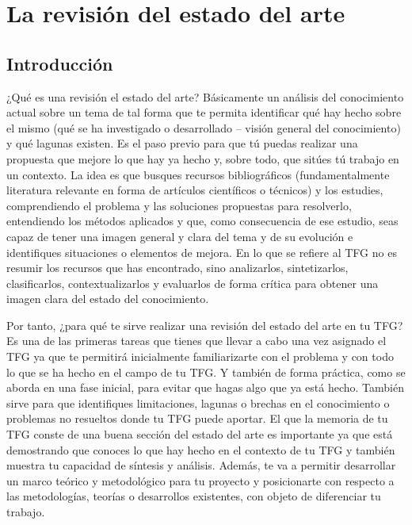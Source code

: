 \chapter{La revisión del estado del arte} \label{cap:RevisionEstadoDelArte}


\section{Introducción}
¿Qué es una revisión el estado del arte? Básicamente un análisis del conocimiento actual sobre un tema de tal forma que te permita identificar qué hay hecho sobre el mismo (qué se ha investigado o desarrollado -- visión general del conocimiento) y qué lagunas existen. Es el paso previo para que tú puedas realizar una propuesta que mejore lo que hay ya hecho y, sobre todo, que sitúes tú trabajo en un contexto. La idea es que busques recursos bibliográficos (fundamentalmente literatura relevante en forma de artículos científicos o técnicos) y los estudies, comprendiendo el problema y las soluciones propuestas para resolverlo, entendiendo los métodos aplicados y que, como consecuencia de ese estudio, seas capaz de tener una imagen general y clara del tema y de su evolución e identifiques situaciones o elementos de mejora. En lo que se refiere al TFG no es resumir los recursos que has encontrado, sino analizarlos, sintetizarlos, clasificarlos, contextualizarlos y evaluarlos de forma crítica para obtener una imagen clara del estado del conocimiento.

Por tanto, ¿para qué te sirve realizar una revisión del estado del arte en tu TFG? Es una de las primeras tareas que tienes que llevar a cabo una vez asignado el TFG ya que te permitirá inicialmente familiarizarte con el problema y con todo lo que se ha hecho en el campo de tu TFG. Y también de forma práctica, como se aborda en una fase inicial, para evitar que hagas algo que ya está hecho. También sirve para que identifiques limitaciones, lagunas o brechas en el conocimiento o problemas no resueltos donde tu TFG puede aportar. El que la memoria de tu TFG conste de una buena sección del estado del arte es importante ya que está demostrando que conoces lo que hay hecho en el contexto de tu TFG y también muestra tu capacidad de síntesis y análisis. Además, te va a permitir desarrollar un marco teórico y metodológico para tu proyecto y posicionarte con respecto a las metodologías, teorías o desarrollos existentes, con objeto de diferenciar tu trabajo. 


